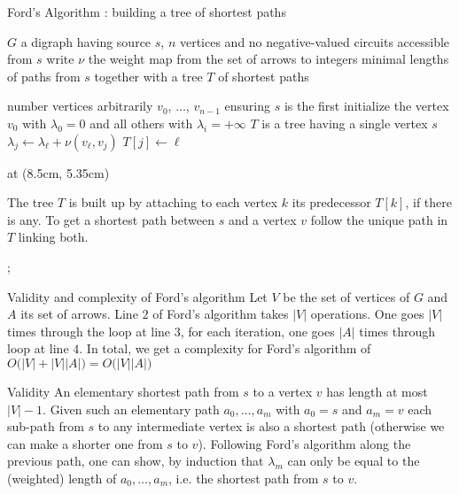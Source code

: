 \documentclass[32pt,aspectratio=169]{beamer}
\begin{document}
\begin{frame}[t]{Ford's Algorithm : building a tree of shortest paths}
    \small{
      \begin{algorithmic}[1]
        \Require $G$ a digraph having source $s$, $n$ vertices and
        no negative-valued circuits accessible from $s$
        \Statex write $\nu$ the weight map from the set of arrows to integers
        \Ensure minimal lengths of paths from $s$ \alert{together with a tree $T$ of shortest paths}

       \State number vertices arbitrarily $v_0$, $\ldots$, $v_{n-1}$ ensuring $s$ is the first
       \State initialize the vertex $v_0$ with $\lambda_0 =0$ and all others with $\lambda_i = +\infty$
       \Statex \alert{$T$ is a tree having a single vertex $s$}
       \State $\lambda_j \gets \lambda_\ell + \nu(v_\ell, v_j)$
       \State \alert{$T[j] \gets \ell$}
       \EndIf
       \EndFor
       \EndFor

     \end{algorithmic}
     }
     \tikzoverlay[text width=5.5cm] at (8.5cm, 5.35cm) {
       \begin{tcolorbox}[
         enhanced,
         parbox = false,
         colback=mLightBrown!10!white,
         colframe=mLightBrown,
         arc=0mm,
         ]
         \small{The tree $T$ is built up by attaching to each vertex $k$ its
         predecessor $T[k]$, if there is any. To get a shortest path
         between $s$ and a vertex $v$ follow the unique path in $T$
         linking both.}
       \end{tcolorbox}%
     };
\end{frame}

\begin{frame}{Validity and complexity of Ford's algorithm}
  Let $V$ be the set of vertices of $G$ and $A$ its set of arrows.
  Line $2$ of Ford's algorithm takes $|V|$ operations. One goes $|V|$
  times through the loop at line $3$, for each iteration, one goes
  $|A|$ times through loop at line $4$. In total, we get a complexity
  for Ford's algorithm of
  $O\big(|V| + |V||A|\big) = O\big( |V||A|\big)$
  \begin{halfshyblock}{Validity}
    An elementary shortest path from $s$ to a vertex $v$ has length at
    most $|V|-1$. Given such an elementary path $a_0, \ldots, a_m$
    with $a_0=s$ and $a_m=v$ each sub-path from $s$ to any
    intermediate vertex is also a shortest path (otherwise we can make
    a shorter one from $s$ to $v$). Following Ford's algorithm along
    the previous path, one can show, by induction that $\lambda_m$ can
    only be equal to the (weighted) length of $a_0, \ldots, a_m$,
    i.e. the shortest path from $s$ to $v$.
  \end{halfshyblock}
\end{frame}
\end{document}
